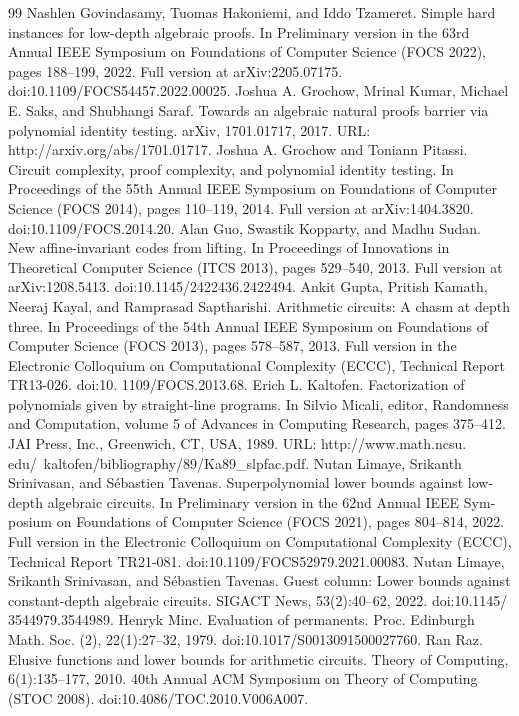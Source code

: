 \begin{thebibliography}{99}
 Nashlen Govindasamy, Tuomas Hakoniemi, and Iddo Tzameret. Simple hard instances for low-depth algebraic proofs. In Preliminary version in the 63rd Annual IEEE Symposium on Foundations of Computer Science (FOCS 2022), pages 188–199, 2022. Full version at arXiv:2205.07175. doi:10.1109/FOCS54457.2022.00025.
 Joshua A. Grochow, Mrinal Kumar, Michael E. Saks, and Shubhangi Saraf. Towards an algebraic natural proofs barrier via polynomial identity testing. arXiv, 1701.01717, 2017. URL: http://arxiv.org/abs/1701.01717.
 Joshua A. Grochow and Toniann Pitassi. Circuit complexity, proof complexity, and polynomial identity testing. In Proceedings of the 55th Annual IEEE Symposium on Foundations of Computer Science (FOCS 2014), pages 110–119, 2014. Full version at arXiv:1404.3820. doi:10.1109/FOCS.2014.20.
 Alan Guo, Swastik Kopparty, and Madhu Sudan. New affine-invariant codes from lifting. In Proceedings of Innovations in Theoretical Computer Science (ITCS 2013), pages 529–540, 2013. Full version at arXiv:1208.5413. doi:10.1145/2422436.2422494.
 Ankit Gupta, Pritish Kamath, Neeraj Kayal, and Ramprasad Saptharishi. Arithmetic circuits: A chasm at depth three. In Proceedings of the 54th Annual IEEE Symposium on Foundations of Computer Science (FOCS 2013), pages 578–587, 2013. Full version in the Electronic Colloquium on Computational Complexity (ECCC), Technical Report TR13-026. doi:10. 1109/FOCS.2013.68.
 Erich L. Kaltofen. Factorization of polynomials given by straight-line programs. In Silvio Micali, editor, Randomness and Computation, volume 5 of Advances in Computing Research, pages 375–412. JAI Press, Inc., Greenwich, CT, USA, 1989. URL: http://www.math.ncsu. edu/~kaltofen/bibliography/89/Ka89\_slpfac.pdf.
 Nutan Limaye, Srikanth Srinivasan, and Sébastien Tavenas. Superpolynomial lower bounds against low-depth algebraic circuits. In Preliminary version in the 62nd Annual IEEE Sym- posium on Foundations of Computer Science (FOCS 2021), pages 804–814, 2022. Full version in the Electronic Colloquium on Computational Complexity (ECCC), Technical Report TR21-081. doi:10.1109/FOCS52979.2021.00083.
 Nutan Limaye, Srikanth Srinivasan, and Sébastien Tavenas. Guest column: Lower bounds against constant-depth algebraic circuits. SIGACT News, 53(2):40–62, 2022. doi:10.1145/ 3544979.3544989.
 Henryk Minc. Evaluation of permanents. Proc. Edinburgh Math. Soc. (2), 22(1):27–32, 1979. doi:10.1017/S0013091500027760.
 Ran Raz. Elusive functions and lower bounds for arithmetic circuits. Theory of Computing, 6(1):135–177, 2010. 40th Annual ACM Symposium on Theory of Computing (STOC 2008). doi:10.4086/TOC.2010.V006A007.

\end{thebibliography}
